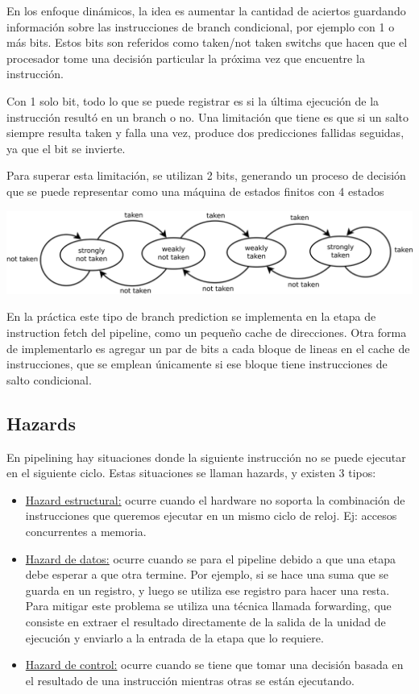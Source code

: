 En los enfoque din\'amicos, la idea es aumentar la cantidad de aciertos guardando informaci\'on sobre las instrucciones de branch condicional, 
por ejemplo con 1 o m\'as bits. Estos bits son referidos como taken/not taken switchs que hacen que el procesador tome una decisi\'on particular
la pr\'oxima vez que encuentre la instrucci\'on.

Con 1 solo bit, todo lo que se puede registrar es si la \'ultima ejecuci\'on de la instrucci\'on result\'o en un branch o no. Una limitaci\'on
que tiene es que si un salto siempre resulta taken y falla una vez, produce dos predicciones fallidas seguidas, ya que el bit se invierte.

Para superar esta limitaci\'on, se utilizan 2 bits, generando un proceso de decisi\'on que se puede representar como una m\'aquina de estados finitos
con 4 estados

\begin{center}
\includegraphics[scale=0.2]{./Graficos/branch_prediction.png} 
\end{center}


En la pr\'actica este tipo de branch prediction se implementa en la etapa de instruction fetch del pipeline, como un peque\~no cache de 
direcciones. Otra forma de implementarlo es agregar un par de bits a cada bloque de lineas en el cache de instrucciones, que se emplean
\'unicamente si ese bloque tiene instrucciones de salto condicional.

\subsection{Hazards}

En pipelining hay situaciones donde la siguiente instrucci\'on no se puede ejecutar en el siguiente ciclo. Estas situaciones se llaman hazards, y existen
3 tipos:

\begin{itemize}
 \item \underline{Hazard estructural:} ocurre cuando el hardware no soporta la combinaci\'on de instrucciones que queremos ejecutar en un mismo ciclo de reloj.
 Ej: accesos concurrentes a memoria.
 \item \underline{Hazard de datos:} ocurre cuando se para el pipeline debido a que una etapa debe esperar a que otra termine. Por ejemplo, si se hace
 una suma que se guarda en un registro, y luego se utiliza ese registro para hacer una resta. Para mitigar este problema se utiliza una 
 t\'ecnica llamada forwarding, que consiste en extraer el resultado directamente de la salida de la unidad de ejecuci\'on y enviarlo a la entrada
 de la etapa que lo requiere.
 \item \underline{Hazard de control:} ocurre cuando se tiene que tomar una decisi\'on basada en el resultado de una instrucci\'on mientras
 otras se est\'an ejecutando.
\end{itemize}


